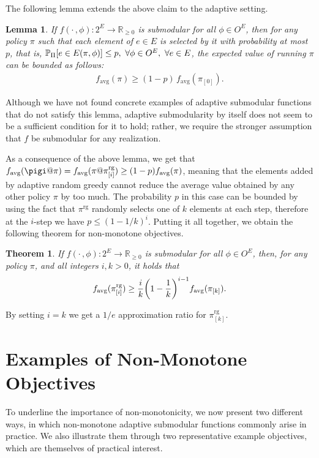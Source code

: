 \documentclass{article}
\newtheorem{theorem}{Theorem}
\newtheorem{lemma}{Lemma}
\let\originalleft\left
\let\originalright\right
\renewcommand{\left}{\mathopen{}\mathclose\bgroup\originalleft}
\renewcommand{\right}{\aftergroup\egroup\originalright}
\newcommand{\pio}{\pi_{[0]}}
\newcommand{\pik}{\pi_{[k]}}
\newcommand{\pig}{\pi^{\textrm{rg}}}
\newcommand{\pigi}{\pi^{\textrm{rg}}_{[i]}}
\newcommand{\pigk}{\pi^{\textrm{rg}}_{[k]}}
\newcommand{\favg}{f_{\mathrm{avg}}}
\begin{document}
The following lemma extends the above claim to the adaptive setting.
\begin{lemma}
  If $f(\cdot\,, \phi) : 2^E \to \mathbb{R}_{\geq 0}$ is submodular for all $\phi \in O^E$, then for any policy $\pi$ such that each element of $e \in E$ is selected by it with probability at most $p$, that is, $\P[\Pi]{e \in E(\pi, \phi)} \leq p,\ \forall \phi \in O^E,\ \forall e \in E$, the expected value of running $\pi$ can be bounded as follows:
\begin{align*}
  \favg(\pi) \geq (1-p)\,\favg(\pio).
\end{align*}
\end{lemma}
\noindent Although we have not found concrete examples of adaptive submodular functions that do not satisfy this lemma, adaptive submodularity by itself does not seem to be a sufficient condition for it to hold; rather, we require the stronger assumption that $f$ be submodular for any realization.

As a consequence of the above lemma, we get that $\favg(\pigi@\pi) = \favg(\pi@\pigi) \geq (1-p)\favg(\pi)$, meaning that the elements added by adaptive random greedy cannot reduce the average value obtained by any other policy $\pi$ by too much.
The probability $p$ in this case can be bounded by using the fact that $\pig$ randomly selects one of $k$ elements at each step, therefore at the $i$-step we have $p \leq (1-1/k)^i$.
Putting it all together, we obtain the following theorem for non-monotone objectives.
\begin{theorem}\label{thm:nonm}
  If $f(\cdot\,, \phi) : 2^E \to \mathbb{R}_{\geq 0}$ is submodular for all $\phi \in O^E$, then, for any policy $\pi$, and all integers $i, k > 0$, it holds that
  \begin{align*}
    \favg(\pigi) \geq \frac{i}{k}\left(1 - \frac{1}{k}\right)^{i-1}\favg(\pik).
  \end{align*}
\end{theorem}
\noindent By setting $i = k$ we get a $1/e$ approximation ratio for $\pigk$.

\section{Examples of Non-Monotone Objectives}
To underline the importance of non-monotonicity, we now present two different ways, in which non-monotone adaptive submodular functions commonly arise in practice.
We also illustrate them through two representative example objectives, which are themselves of practical interest.
\end{document}
